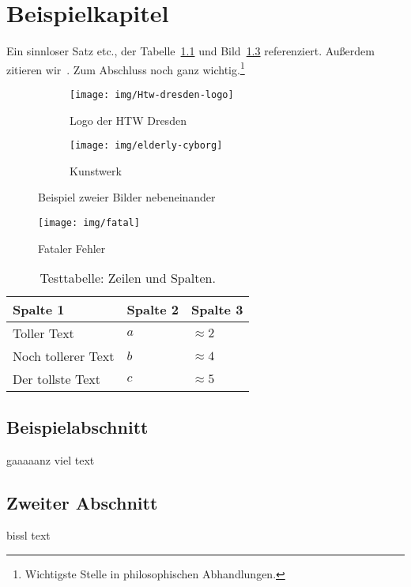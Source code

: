 
\chapter{Beispielkapitel}


Ein sinnloser Satz \gls{etc.}, der Tabelle~\ref{tab:testtable} und Bild~\ref{fig:testfig} referenziert.
Außerdem zitieren wir~\cite{test16}.
Zum Abschluss noch ganz wichtig.\footnote{Wichtigste Stelle in philosophischen Abhandlungen.}


\begin{figure}
    \centering
    \begin{subfigure}[b]{0.48\linewidth}
        \centering
        \texttt{[image: img/Htw-dresden-logo]}
        \caption{Logo der HTW Dresden}\label{fig:logo-htw}
    \end{subfigure}\enspace%
    \begin{subfigure}[b]{0.48\linewidth}
        \centering
        \texttt{[image: img/elderly-cyborg]}
        \caption{Kunstwerk}\label{fig:kunstwerk}
    \end{subfigure}
    \caption{Beispiel zweier Bilder nebeneinander}\label{fig:testfig}
\end{figure}

\begin{figure}
    \centering
    \texttt{[image: img/fatal]}
    \caption{Fataler Fehler}\label{fig:fatal}
\end{figure}

\begin{table}
    \centering
    \caption[Testtable]%
        {Testtabelle: Zeilen und Spalten.}
    \begin{tabular}{lll}
        \toprule
        Spalte 1 & Spalte 2 & Spalte 3 \\
        \midrule
        Toller Text  & $a$ & $\approx 2$ \\
        Noch tollerer Text & $b$ & $\approx 4$ \\
        Der tollste Text & $c$ & $\approx 5$ \\
        \bottomrule
    \end{tabular}\label{tab:testtable}
\end{table}

\section{Beispielabschnitt}

gaaaaanz viel text

\section{Zweiter Abschnitt}

bissl text

